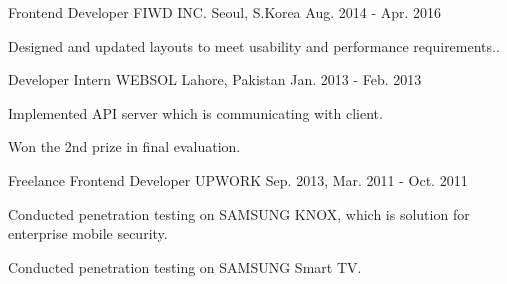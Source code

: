 \begin{cventries}
  \cventry
    {Frontend Developer} %
    {FIWD INC.} %
    {Seoul, S.Korea} %
    {Aug. 2014 - Apr. 2016} %
    {
      \begin{cvitems} %
        \item {Designed and updated layouts to meet usability and performance requirements..}
        \end{cvitems}
    }

  \cventry
    {Developer Intern} %
    {WEBSOL} %
    {Lahore, Pakistan} %
    {Jan. 2013 - Feb. 2013} %
    {
      \begin{cvitems} %
        \item {Implemented API server which is communicating with client.}
        \item {Won the 2nd prize in final evaluation.}
      \end{cvitems}
    }

  \cventry
    {Freelance Frontend Developer} %
    {UPWORK} %
    {Sep. 2013, Mar. 2011 - Oct. 2011} %
    {
      \begin{cvitems} %
        \item {Conducted penetration testing on SAMSUNG KNOX, which is solution for enterprise mobile security.}
        \item {Conducted penetration testing on SAMSUNG Smart TV.}
      \end{cvitems}
    }

\end{cventries}

